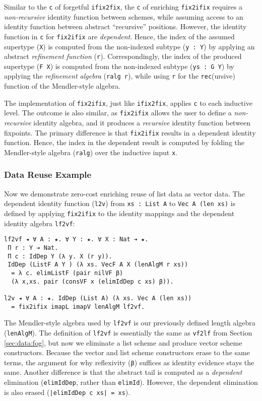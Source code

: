\documentclass[acmsmall]{acmart}\settopmatter{}
\newcommand{\refsec}[1]{Section \ref{sec:#1}}
\begin{document}
Similar to the \verb;c; of forgetful \verb;ifix2fix;,
the \verb;c; of enriching \verb;fix2ifix; requires a
\textit{non-recursive} identity function between schemes, while assuming
access to an identity function between abstract ``recursive''
positions. However, the identity function in \verb;c; for
\verb;fix2ifix; are \textit{dependent}. Hence, the index of the
assumed supertype (\verb;X;) is computed from the non-indexed
subtype (\verb;y : Y;) by applying an abstract
\textit{refinement function} (\verb;r;).
Correspondingly, the index of the produced supertype
(\verb;F X;) is computed from the non-indexed
subtype (\verb;ys : G Y;) by applying the
\textit{refinement algebra} (\verb;ralg r;), while using \verb;r; for
the \verb;rec;(ursive) function of the Mendler-style algebra.

The implementation of \verb;fix2ifix;, just like \verb;ifix2fix;,
applies \verb;c; to each inductive level. The outcome is also similar,
as \verb;fix2ifix; allows the user to define a \textit{non-recursive}
identity algebra, and it produces a \textit{recursive} identity
function between fixpoints. The primary difference is
that \verb;fix2ifix; results in a dependent identity function. Hence,
the index in the dependent result is computed by folding
the Mendler-style algebra (\verb;ralg;) over the inductive input
\verb;x;. 

\subsubsection{Data Reuse Example}

Now we demonstrate zero-cost enriching reuse of list data as vector
data. The dependent identity function (\verb;l2v;)
from \verb;xs : List A; to \verb;Vec A (len xs); is defined by
applying \verb;fix2ifix; to the identity mappings and the
dependent identity algebra \verb;lf2vf;:
\begin{verbatim}
lf2vf ◂ ∀ A : ★. ∀ Y : ★. ∀ X : Nat ➔ ★.
 Π r : Y ➔ Nat. 
 Π c : IdDep Y (λ y. X (r y)).
 IdDep (ListF A Y ) (λ xs. VecF A X (lenAlgM r xs))
  = λ c. elimListF (pair nilVF β)
  (λ x,xs. pair (consVF x (elimIdDep c xs) β)).
 
l2v ◂ ∀ A : ★. IdDep (List A) (λ xs. Vec A (len xs))
  = fix2ifix imapL imapV lenAlgM lf2vf.
\end{verbatim}
The Mendler-style algebra used by \verb;lf2vf; is our previously
defined length algebra (\verb;lenAlgM;).
The definition of \verb;lf2vf; is essentially the same as
\verb;vf2lf; from \refsec{data:fog}, but now we eliminate a list
scheme and produce vector scheme constructors. Because the vector and
list scheme constructors erase to the same terms, the argument for why
reflexivity (\verb;β;) suffices as identity evidence stays the same.
Another difference is that the abstract tail is computed as a \textit{dependent}
elimination (\verb;elimIdDep;, rather than \verb;elimId;).
However, the dependent elimination is also erased
(\verb;|elimIdDep c xs| = xs;).
\end{document}
